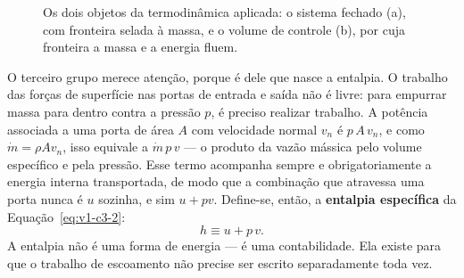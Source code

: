 \documentclass[12pt,a4paper]{article}
\numberwithin{equation}{section}
\numberwithin{table}{section}
\numberwithin{figure}{section}
\begin{document}
\begin{figure}[H]
\centering
{}
\caption[Sistema fechado e volume de controle.]{Os dois objetos da
termodinâmica aplicada: o sistema fechado (a), com fronteira selada à massa,
e o volume de controle (b), por cuja fronteira a massa e a energia fluem.}
\label{fig:v1-c3-1}
\end{figure}


O terceiro grupo merece atenção, porque é dele que nasce a entalpia. O trabalho
das forças de superfície nas portas de entrada e saída não é livre: para
empurrar massa para dentro contra a pressão $p$, é preciso realizar trabalho. A
potência associada a uma porta de área $A$ com velocidade normal $v_n$ é
$p\,A\,v_n$, e como $\dot{m} = \rho A v_n$, isso equivale a $\dot{m}\,p\,v$ ---
o produto da vazão mássica pelo volume específico e pela pressão. Esse termo
acompanha sempre e obrigatoriamente a energia interna transportada, de modo que
a combinação que atravessa uma porta nunca é $u$ sozinha, e sim $u + pv$.
Define-se, então, a \textbf{entalpia específica} da
Equação~\eqref{eq:v1-c3-2}:
\begin{equation}\label{eq:v1-c3-2}
h \equiv u + p\,v .
\end{equation}
A entalpia não é uma forma de energia --- é uma contabilidade. Ela existe para
que o trabalho de escoamento não precise ser escrito separadamente toda vez.
\end{document}
